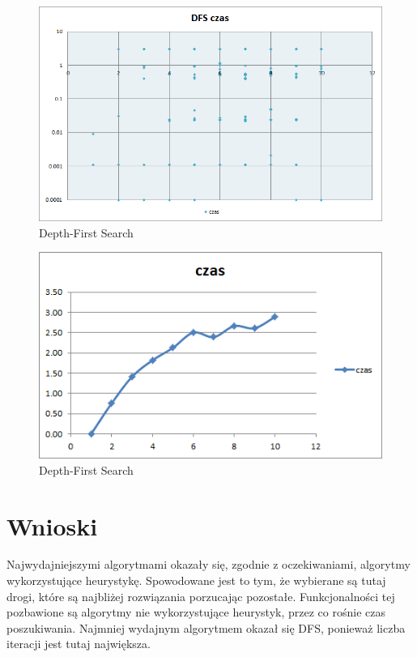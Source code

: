 \documentclass{classrep}
\begin{document}
\begin{figure}[ht]
\centering
			\includegraphics[scale=0.65]{pictures/DFS_czas_log.png}
	\caption{Depth-First Search}
	\label{fig:Depth-First Search}
\end{figure}

\begin{figure}[ht]
\centering
			\includegraphics[scale=0.65]{pictures/old/dfs_time.png}
	\caption{Depth-First Search}
	\label{fig:Depth-First Search}
\end{figure}


\clearpage

\section{Wnioski}
  Najwydajniejszymi algorytmami okazały się, zgodnie z oczekiwaniami, algorytmy wykorzystujące heurystykę. Spowodowane jest to tym, że wybierane są tutaj drogi, które są najbliżej rozwiązania porzucając pozostałe. Funkcjonalności tej pozbawione są algorytmy nie wykorzystujące heurystyk, przez co rośnie czas poszukiwania. Najmniej wydajnym algorytmem okazał się DFS, ponieważ liczba iteracji jest tutaj największa.
\end{document}
